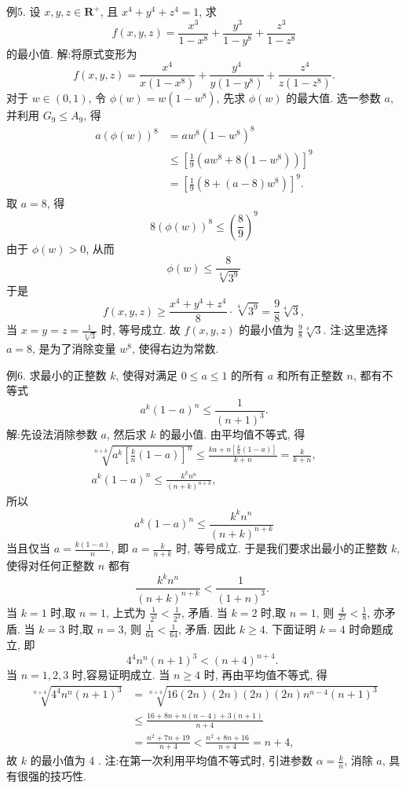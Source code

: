 例5. 设 $x, y, z \in \mathbf{R}^{+}$, 且 $x^4+y^4+z^4=1$, 求
$$
f(x, y, z)=\frac{x^3}{1-x^8}+\frac{y^3}{1-y^8}+\frac{z^3}{1-z^8}
$$
的最小值.
解:将原式变形为
$$
f(x, y, z)=\frac{x^4}{x\left(1-x^8\right)}+\frac{y^4}{y\left(1-y^8\right)}+\frac{z^4}{z\left(1-z^8\right)} .
$$
对于 $w \in(0,1)$, 令 $\phi(w)=w\left(1-w^8\right)$, 先求 $\phi(w)$ 的最大值.
选一参数 $a$, 并利用 $G_9 \leqslant A_9$, 得
$$
\begin{aligned}
a(\phi(w))^8 & =a w^8\left(1-w^8\right)^8 \\
& \leqslant\left[\frac{1}{9}\left(a w^8+8\left(1-w^8\right)\right)\right]^9 \\
& =\left[\frac{1}{9}\left(8+(a-8) w^8\right)\right]^9 .
\end{aligned}
$$
取 $a=8$, 得
$$
8(\phi(w))^8 \leqslant\left(\frac{8}{9}\right)^9
$$
由于 $\phi(w)>0$, 从而
$$
\phi(w) \leqslant \frac{8}{\sqrt[4]{3^9}}
$$
于是
$$
f(x, y, z) \geqslant \frac{x^4+y^4+z^4}{8} \cdot \sqrt[4]{3^9}=\frac{9}{8} \sqrt[4]{3},
$$
当 $x=y=z=\frac{1}{\sqrt[4]{3}}$ 时, 等号成立.
故 $f(x, y, z)$ 的最小值为 $\frac{9}{8} \sqrt[4]{3}$.
注:这里选择 $a=8$, 是为了消除变量 $w^8$, 使得右边为常数.



例6. 求最小的正整数 $k$, 使得对满足 $0 \leqslant a \leqslant 1$ 的所有 $a$ 和所有正整数 $n$, 都有不等式
$$
a^k(1-a)^n \leqslant \frac{1}{(n+1)^3} .
$$
解:先设法消除参数 $a$, 然后求 $k$ 的最小值.
由平均值不等式, 得
$$
\begin{gathered}
\sqrt[n+k]{a^k\left[\frac{k}{n}(1-a)\right]^n} \leqslant \frac{k a+n\left[\frac{k}{n}(1-a)\right]}{k+n}=\frac{k}{k+n}, \\
a^k(1-a)^n \leqslant \frac{k^k n^n}{(n+k)^{n+k}},
\end{gathered}
$$
所以
$$
a^k(1-a)^n \leqslant \frac{k^k n^n}{(n+k)^{n+k}}
$$
当且仅当 $a=\frac{k(1-a)}{n}$, 即 $a=\frac{k}{n+k}$ 时, 等号成立.
于是我们要求出最小的正整数 $k$, 使得对任何正整数 $n$ 都有
$$
\frac{k^k n^n}{(n+k)^{n+k}}<\frac{1}{(1+n)^3} \text {. }
$$
当 $k=1$ 时,取 $n=1$, 上式为 $\frac{1}{2^2}<\frac{1}{2^3}$, 矛盾.
当 $k=2$ 时,取 $n=1$, 则 $\frac{4}{27}<\frac{1}{8}$, 亦矛盾.
当 $k=3$ 时,取 $n=3$, 则 $\frac{1}{64}<\frac{1}{64}$, 矛盾.
因此 $k \geqslant 4$. 下面证明 $k=4$ 时命题成立, 即
$$
4^4 n^n(n+1)^3<(n+4)^{n+4} \text {. }
$$
当 $n=1,2,3$ 时,容易证明成立.
当 $n \geqslant 4$ 时, 再由平均值不等式, 得
$$
\begin{aligned}
\sqrt[n+4]{4^4 n^n(n+1)^3} & =\sqrt[n+4]{16(2 n)(2 n)(2 n)(2 n) n^{n-4}(n+1)^3} \\
& \leqslant \frac{16+8 n+n(n-4)+3(n+1)}{n+4} \\
& =\frac{n^2+7 n+19}{n+4}<\frac{n^2+8 n+16}{n+4}=n+4,
\end{aligned}
$$
故 $k$ 的最小值为 4 .
注:在第一次利用平均值不等式时, 引进参数 $\alpha=\frac{k}{n}$, 消除 $a$, 具有很强的技巧性.


